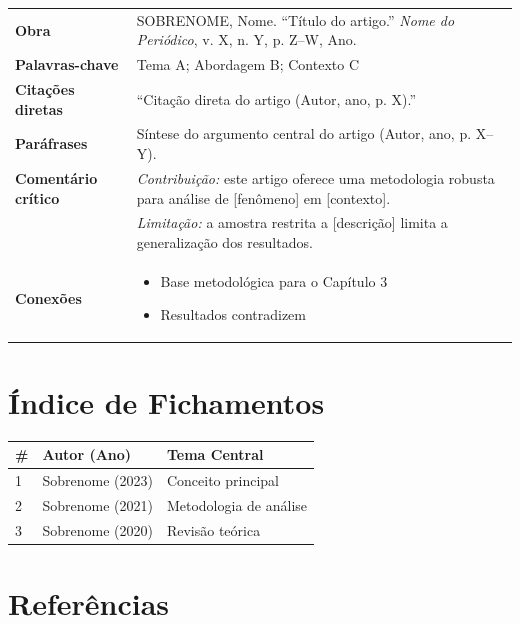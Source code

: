 \documentclass[
  12pt,
  a4paper,
  brazilian
]{article}
\begin{document}
\begin{longtable}{p{3cm} p{12cm}}
\toprule
\textbf{Obra} & SOBRENOME, Nome. ``Título do artigo.'' \textit{Nome do
               Periódico}, v. X, n. Y, p. Z--W, Ano. \\
\textbf{Palavras-chave} & Tema A; Abordagem B; Contexto C \\
\midrule
\textbf{Citações diretas} &
  ``Citação direta do artigo (Autor, ano, p. X).'' \\
\midrule
\textbf{Paráfrases} &
  Síntese do argumento central do artigo (Autor, ano, p. X--Y). \\
\midrule
\textbf{Comentário crítico} &
  \textit{Contribuição:} este artigo oferece uma metodologia robusta
  para análise de [fenômeno] em [contexto]. \\
&
  \textit{Limitação:} a amostra restrita a [descrição] limita a
  generalização dos resultados. \\
\midrule
\textbf{Conexões} &
  \begin{itemize}[nosep]
    \item Base metodológica para o Capítulo 3
    \item Resultados contradizem \cite{autor2022}
  \end{itemize} \\
\bottomrule
\end{longtable}

\newpage

\section*{Índice de Fichamentos}

\begin{longtable}{lll}
\toprule
\textbf{\#} & \textbf{Autor (Ano)} & \textbf{Tema Central} \\
\midrule
1 & Sobrenome (2023) & Conceito principal \\
2 & Sobrenome (2021) & Metodologia de análise \\
3 & Sobrenome (2020) & Revisão teórica \\
\bottomrule
\end{longtable}

\section*{Referências}



\end{document}
